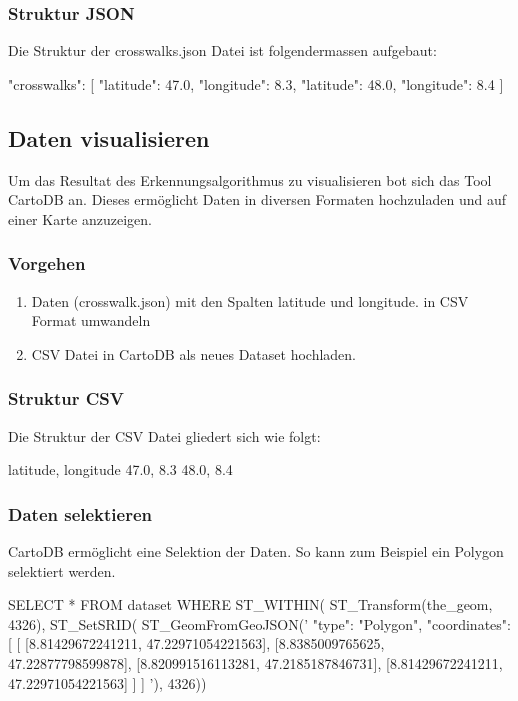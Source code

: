 \subsubsection{Struktur JSON}
Die Struktur der crosswalks.json Datei ist folgendermassen aufgebaut:
\medskip
\begin{python}
{
	"crosswalks":
	[
		{"latitude": 47.0, "longitude": 8.3},
		{"latitude": 48.0, "longitude": 8.4}
	]
}
\end{python}

\newpage

\subsection{Daten visualisieren}
Um das Resultat des Erkennungsalgorithmus zu visualisieren bot sich das Tool CartoDB \cite{CartoDB} an. Dieses ermöglicht Daten in diversen Formaten hochzuladen und auf einer Karte anzuzeigen.

\subsubsection{Vorgehen}
\begin{enumerate}
	\item Daten (crosswalk.json) mit den Spalten latitude und longitude. in CSV Format umwandeln
	\item CSV Datei in CartoDB als neues Dataset hochladen.
\end{enumerate}

\subsubsection{Struktur CSV}
Die Struktur der CSV Datei gliedert sich wie folgt:
\medskip
\begin{python}
	latitude,	longitude
	47.0,		8.3
	48.0,		8.4
\end{python}


\subsubsection{Daten selektieren}
CartoDB ermöglicht eine Selektion der Daten. So kann zum Beispiel ein Polygon selektiert werden.
\medskip
\begin{python}
SELECT * FROM dataset WHERE ST_WITHIN(
 	ST_Transform(the_geom, 4326), ST_SetSRID(
 	ST_GeomFromGeoJSON('{ "type": "Polygon",
        "coordinates": [
          [ [8.81429672241211,
             47.22971054221563],
            [8.8385009765625,
             47.22877798599878],
            [8.820991516113281,
             47.2185187846731],
            [8.81429672241211,
             47.22971054221563]
          ]
        ] }'),
   4326))
\end{python}
\newpage
